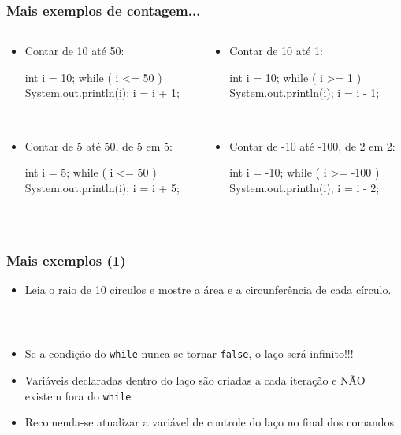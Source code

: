 \documentclass[xcolor={dvipsnames,table},aspectratio=169]{beamer}
\begin{document}
\begin{frame}[fragile]\frametitle{Mais exemplos de contagem...}
\begin{columns}[T]
	\begin{column}{0.5\linewidth}
\begin{itemize}
	\item Contar de 10 até 50:\\
{\scriptsize
\begin{javacode}
int i = 10;
while ( i <= 50 ) {
      System.out.println(i);
      i = i + 1;
}
\end{javacode}
}\\		
	\item Contar de 5 até 50, de 5 em 5:\\
{\scriptsize
\begin{javacode}
int i = 5;
while ( i <= 50 ) {
      System.out.println(i);
      i = i + 5;
}
\end{javacode}
}\\		
\end{itemize}
	\end{column}
	\begin{column}{0.5\linewidth}
\begin{itemize}
	\item Contar de 10 até 1:\\
{\scriptsize
\begin{javacode}
int i = 10;
while ( i >= 1 ) {
      System.out.println(i);
      i = i - 1;
}
\end{javacode}
}\\		
	\item Contar de -10 até -100, de 2 em 2:\\
{\scriptsize
\begin{javacode}
int i = -10;
while ( i >= -100 ) {
      System.out.println(i);
      i = i - 2;
}
\end{javacode}
}\\		
\end{itemize}	
	\end{column}
\end{columns}
\end{frame}

\begin{frame}[fragile]\frametitle{Mais exemplos (1)}
\begin{itemize}
	\item Leia o raio de 10 círculos e mostre a área e a circunferência de cada círculo.\\
	{\tiny\inputminted[bgcolor=cyan!10]{java}{src/Circulo1.java}}\\
	\item Se a condição do \texttt{while} nunca se tornar \texttt{false}, o laço será infinito!!!
	\item Variáveis declaradas dentro do laço são criadas a cada iteração e NÃO existem fora do \texttt{while}
	\item Recomenda-se atualizar a variável de controle do laço no final dos comandos
\end{itemize}
\end{frame}
\end{document}
